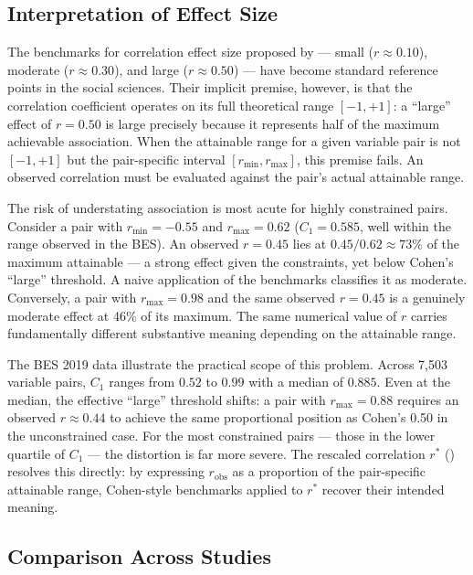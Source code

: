 \documentclass[
  12pt,
]{article}
\theoremstyle{plain}
\theoremstyle{definition}
\theoremstyle{remark}
\begin{document}
\subsection{Interpretation of Effect
Size}\label{interpretation-of-effect-size}

The benchmarks for correlation effect size proposed by
\textcite{cohe02-applied} --- small (\(r \approx 0.10\)), moderate
(\(r \approx 0.30\)), and large (\(r \approx 0.50\)) --- have become
standard reference points in the social sciences. Their implicit
premise, however, is that the correlation coefficient operates on its
full theoretical range \([-1, +1]\): a ``large'' effect of \(r = 0.50\)
is large precisely because it represents half of the maximum achievable
association. When the attainable range for a given variable pair is not
\([-1, +1]\) but the pair-specific interval \([r_{\min}, r_{\max}]\),
this premise fails. An observed correlation must be evaluated against
the pair's actual attainable range.

The risk of understating association is most acute for highly
constrained pairs. Consider a pair with \(r_{\min} = -0.55\) and
\(r_{\max} = 0.62\) (\(C_1 = 0.585\), well within the range observed in
the BES). An observed \(r = 0.45\) lies at \(0.45/0.62 \approx 73\%\) of
the maximum attainable --- a strong effect given the constraints, yet
below Cohen's ``large'' threshold. A naive application of the benchmarks
classifies it as moderate. Conversely, a pair with \(r_{\max} = 0.98\)
and the same observed \(r = 0.45\) is a genuinely moderate effect at
46\% of its maximum. The same numerical value of \(r\) carries
fundamentally different substantive meaning depending on the attainable
range.

The BES 2019 data illustrate the practical scope of this problem. Across
7,503 variable pairs, \(C_1\) ranges from \(0.52\) to \(0.99\) with a
median of \(0.885\). Even at the median, the effective ``large''
threshold shifts: a pair with \(r_{\max} = 0.88\) requires an observed
\(r \approx 0.44\) to achieve the same proportional position as Cohen's
0.50 in the unconstrained case. For the most constrained pairs --- those
in the lower quartile of \(C_1\) --- the distortion is far more severe.
The rescaled correlation \(r^*\) ()
resolves this directly: by expressing \(r_{\text{obs}}\) as a proportion
of the pair-specific attainable range, Cohen-style benchmarks applied to
\(r^*\) recover their intended meaning.

\subsection{Comparison Across Studies}\label{comparison-across-studies}
\end{document}
